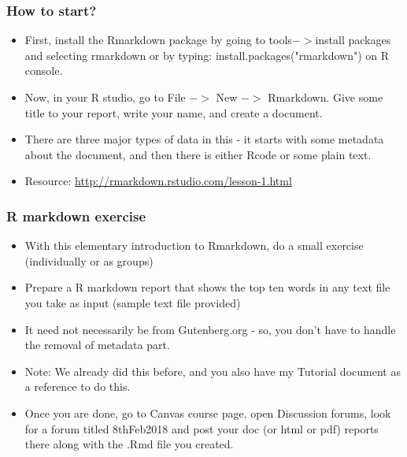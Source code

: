 \documentclass{beamer}
\begin{document}
\begin{frame}
\frametitle{How to start?}
\begin{itemize}
\item First, install the Rmarkdown package by going to tools$->$install packages and selecting rmarkdown or by typing: install.packages("rmarkdown") on R console. \pause
\item Now, in your R studio, go to File $->$ New $->$ Rmarkdown. Give some title to your report, write your name, and create a document. \pause
\item There are three major types of data in this - it starts with some metadata about the document, and then there is either Rcode or some plain text.
\item Resource: \url{http://rmarkdown.rstudio.com/lesson-1.html}
\end{itemize}
\end{frame}

\begin{frame}
\frametitle{R markdown exercise}
\begin{itemize}
\item With this elementary introduction to Rmarkdown, do a small exercise (individually or as groups)
\item Prepare a R markdown report that shows the top ten words in any text file you take as input (sample text file provided) 
\item It need not necessarily be from Gutenberg.org - so, you don't have to handle the removal of metadata part. 
\item Note: We already did this before, and you also have my Tutorial document as a reference to do this.
\item Once you are done, go to Canvas course page, open Discussion forums, look for a forum titled 8thFeb2018 and post your doc (or html or pdf) reports there along with the .Rmd file you created.
\end{itemize}
\end{frame}
\end{document}
